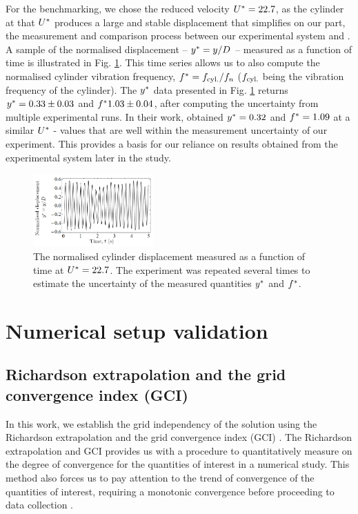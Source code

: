 \documentclass[oneside]{utmthesis}
\begin{document}
For the benchmarking, we chose the reduced velocity $U^{*} = 22.7$, as the cylinder at that $U^{*}$ produces a large and stable displacement that simplifies on our part, the measurement and comparison process between our experimental system and \citet{Koide2013}. A sample of the normalised displacement -- $y^{*} = y/D$ -- measured as a function of time is illustrated in Fig. \ref{fig:sampTimeHist}. This time series allows us to also compute the normalised cylinder vibration frequency, $f^{*} = f_{\text{cyl.}}/f_{n}$ ($f_{\text{cyl.}}$ being the vibration frequency of the cylinder). The $y^{*}$ data presented in Fig. \ref{fig:sampTimeHist} returns $y^{*} = 0.33 \pm 0.03$ and $f^{*} 1.03 \pm 0.04$, after computing the uncertainty from multiple experimental runs. In their work, \citet{Koide2013} obtained $y^{*} = 0.32$ and $f^{*} = 1.09$ at a similar $U^{*}$ - values that are well within the measurement uncertainty of our experiment. This provides a basis for our reliance on results obtained from the experimental system later in the study.

\begin{figure}
  \centering
  \includegraphics[width=0.41\textwidth]{figs/figure5}
  \caption{The normalised cylinder displacement measured as a function of time at $U^{*} = 22.7$. The experiment was repeated several times to estimate the uncertainty of the measured quantities $y^{*}$ and $f^{*}$.}
  \label{fig:sampTimeHist}
\end{figure}




\chapter{Numerical setup validation} \label{chap:numSetup}
\section{Richardson extrapolation and the grid convergence index (GCI)} \label{sec:richExtrap}
In this work, we establish the grid independency of the solution using the Richardson extrapolation and the grid convergence index (GCI) \citep{Richardson1927,Stern2001}. The Richardson extrapolation and GCI provides us with a procedure to quantitatively measure on the degree of convergence for the quantities of interest in a numerical study. This method also forces us to pay attention to the trend of convergence of the quantities of interest, requiring a monotonic convergence before proceeding to data collection \citep{Stern2001,MatAli2011,Ali2012,Maruai2018}.
\end{document}
